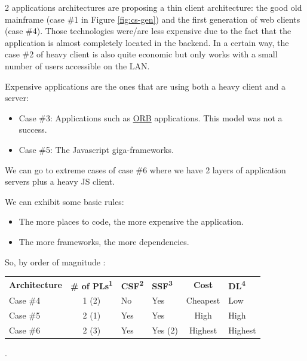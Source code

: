 \documentclass[]{article}
\begin{document}
2 applications architectures are proposing a thin client architecture: the good old mainframe (case \#1 in Figure \ref{fig:cs-gen}) and the first generation of web clients (case \#4). Those technologies were/are less expensive due to the fact that the application is almost completely located in the backend. In a certain way, the case \#2 of heavy client is also quite economic but only works with a small number of users accessible on the LAN.

Expensive applications are the ones that are using both a heavy client and a server:

\begin{itemize}
\item Case \#3: Applications such as \href{https://en.wikipedia.org/wiki/Object_request_broker}{ORB} applications. This model was not a success.
\item Case \#5: The Javascript giga-frameworks.
\end{itemize}

We can go to extreme cases of case \#6 where we have 2 layers of application servers plus a heavy JS client.

We can exhibit some basic rules:

\begin{itemize}
\item The more places to code, the more expensive the application.
\item The more frameworks, the more dependencies.
\end{itemize}

So, by order of magnitude :

\begin{center}
{\small\begin{tabular}{lcllcl}
\rowcolor{gray!50}
\textbf{Architecture} & \textbf{\# of PLs\textsuperscript{1}} & \textbf{CSF\textsuperscript{2}} & \textbf{SSF\textsuperscript{3}} & \textbf{Cost} & \textbf{DL\textsuperscript{4}} \\
Case \#4 & 1 (2) & No  & Yes             & Cheapest & Low\\
Case \#5 & 2 (1) & Yes & Yes             & High     & High\\
Case \#6 & 2 (3) & Yes & Yes (2) & Highest  & Highest\\
\end{tabular}}
\end{center}

.
\end{document}
